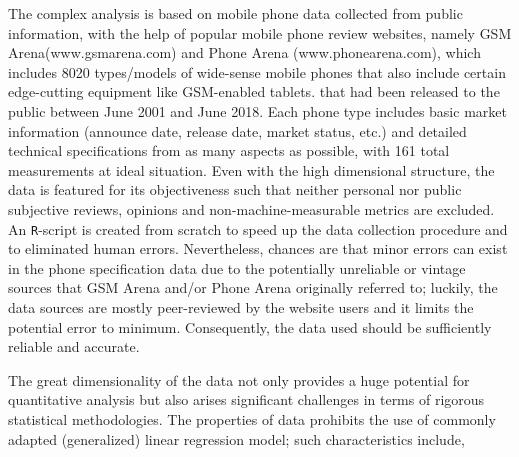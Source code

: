 \documentclass[utf8,english]{gradu3}
\begin{document}
The complex analysis is based on mobile phone data collected from public information, with the help of popular mobile phone review websites, namely GSM Arena(www.gsmarena.com) and Phone Arena (www.phonearena.com), which includes 8020 types/models of wide-sense mobile phones that also include certain edge-cutting equipment like GSM-enabled tablets. that had been released to the public between June 2001 and June 2018. Each phone type includes basic market information (announce date, release date, market status, etc.) and detailed technical specifications from as many aspects as possible, with 161 total measurements at ideal situation. Even with the high dimensional structure, the data is featured for its objectiveness such that neither personal nor public subjective reviews, opinions and non-machine-measurable metrics are excluded. An \texttt{R}-script is created from scratch to speed up the data collection procedure and to eliminated human errors. Nevertheless, chances are that minor errors can exist in the phone specification data due to the potentially unreliable or vintage sources that GSM Arena and/or Phone Arena originally referred to; luckily, the data sources are mostly peer-reviewed by the website users and it limits the potential error to minimum. Consequently, the data used should be sufficiently reliable and accurate.

The great dimensionality of the data not only provides a huge potential for quantitative analysis but also arises significant challenges in terms of rigorous statistical methodologies. The properties of data prohibits the use of commonly adapted (generalized) linear regression model; such characteristics include,
\end{document}
